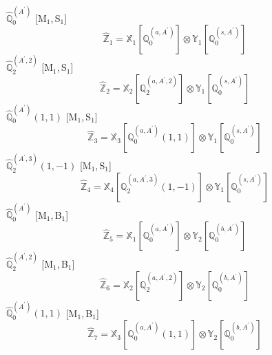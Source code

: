 \documentclass[fleqn,10pt,landscape]{article}
\begin{document}
\begin{itemize}
\vspace{4mm}
\noindent {} $\,\,\,\hat{\mathbb{Q}}_{0}^{(A^{\prime})}$ [M$_{1}$,\,S$_{1}$]
\begin{dmath*}
\hat{\mathbb{Z}}_{1}=\mathbb{X}_{1}[\mathbb{Q}_{0}^{(a,A^{\prime})}] \otimes\mathbb{Y}_{1}[\mathbb{Q}_{0}^{(s,A^{\prime})}]
\end{dmath*}
\vspace{4mm}
\noindent {} $\,\,\,\hat{\mathbb{Q}}_{2}^{(A^{\prime},2)}$ [M$_{1}$,\,S$_{1}$]
\begin{dmath*}
\hat{\mathbb{Z}}_{2}=\mathbb{X}_{2}[\mathbb{Q}_{2}^{(a,A^{\prime},2)}] \otimes\mathbb{Y}_{1}[\mathbb{Q}_{0}^{(s,A^{\prime})}]
\end{dmath*}
\vspace{4mm}
\noindent {} $\,\,\,\hat{\mathbb{Q}}_{0}^{(A^{\prime})}(1,1)$ [M$_{1}$,\,S$_{1}$]
\begin{dmath*}
\hat{\mathbb{Z}}_{3}=\mathbb{X}_{3}[\mathbb{Q}_{0}^{(a,A^{\prime})}(1,1)] \otimes\mathbb{Y}_{1}[\mathbb{Q}_{0}^{(s,A^{\prime})}]
\end{dmath*}
\vspace{4mm}
\noindent {} $\,\,\,\hat{\mathbb{Q}}_{2}^{(A^{\prime},3)}(1,-1)$ [M$_{1}$,\,S$_{1}$]
\begin{dmath*}
\hat{\mathbb{Z}}_{4}=\mathbb{X}_{4}[\mathbb{Q}_{2}^{(a,A^{\prime},3)}(1,-1)] \otimes\mathbb{Y}_{1}[\mathbb{Q}_{0}^{(s,A^{\prime})}]
\end{dmath*}
\vspace{4mm}
\noindent {} $\,\,\,\hat{\mathbb{Q}}_{0}^{(A^{\prime})}$ [M$_{1}$,\,B$_{1}$]
\begin{dmath*}
\hat{\mathbb{Z}}_{5}=\mathbb{X}_{1}[\mathbb{Q}_{0}^{(a,A^{\prime})}] \otimes\mathbb{Y}_{2}[\mathbb{Q}_{0}^{(b,A^{\prime})}]
\end{dmath*}
\vspace{4mm}
\noindent {} $\,\,\,\hat{\mathbb{Q}}_{2}^{(A^{\prime},2)}$ [M$_{1}$,\,B$_{1}$]
\begin{dmath*}
\hat{\mathbb{Z}}_{6}=\mathbb{X}_{2}[\mathbb{Q}_{2}^{(a,A^{\prime},2)}] \otimes\mathbb{Y}_{2}[\mathbb{Q}_{0}^{(b,A^{\prime})}]
\end{dmath*}
\vspace{4mm}
\noindent {} $\,\,\,\hat{\mathbb{Q}}_{0}^{(A^{\prime})}(1,1)$ [M$_{1}$,\,B$_{1}$]
\begin{dmath*}
\hat{\mathbb{Z}}_{7}=\mathbb{X}_{3}[\mathbb{Q}_{0}^{(a,A^{\prime})}(1,1)] \otimes\mathbb{Y}_{2}[\mathbb{Q}_{0}^{(b,A^{\prime})}]

\end{dmath*}
\end{itemize}
\end{document}
